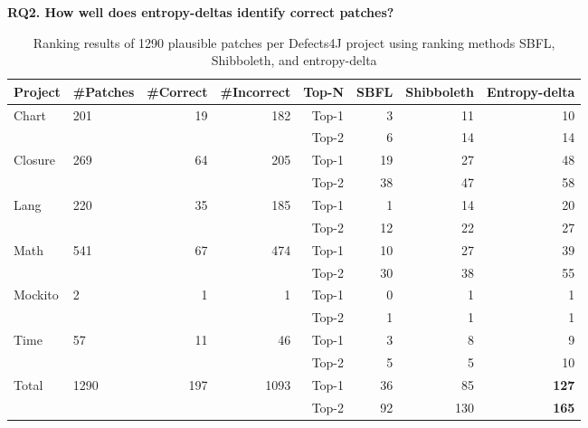 \documentclass[12pt,openany,oneside,table]{cmuthesis}
\begin{document}
\noindent\textbf{RQ2. How well does entropy-deltas identify correct patches?}
\begin{table}[t]
  \centering
\caption{\small Ranking results of 1290 plausible patches per Defects4J project using ranking methods SBFL, Shibboleth, and entropy-delta}
\begin{tabular}{l|lrrrrrr} 
\toprule
 \textbf{Project} & \textbf{\#Patches} & \textbf{\#Correct} &
 \textbf{\#Incorrect} & \textbf{Top-N} & \textbf{SBFL} & \textbf{Shibboleth} &
 \textbf{Entropy-delta}\\
\midrule
\multirow{2}{*}{Chart} & \multirow{2}{*}{201} & \multirow{2}{*}{19} &
\multirow{2}{*}{182} & Top-1              & 3  & 11  & 10   \\
&  &  & & Top-2              & 6  & 14  & 14   \\

\midrule
\multirow{2}{*}{Closure} & \multirow{2}{*}{269} & \multirow{2}{*}{64} &
\multirow{2}{*}{205} & Top-1              & 19  & 27  & 48   \\
&  &  & & Top-2              & 38  & 47  & 58   \\

\midrule
\multirow{2}{*}{Lang} & \multirow{2}{*}{220} & \multirow{2}{*}{35} &
\multirow{2}{*}{185} & Top-1              & 1  & 14  & 20   \\
&  &  & & Top-2              & 12  & 22  & 27   \\

\midrule
\multirow{2}{*}{Math} & \multirow{2}{*}{541} & \multirow{2}{*}{67} &
\multirow{2}{*}{474} & Top-1              & 10  & 27  & 39   \\
&  &  & & Top-2              & 30  & 38  & 55   \\

\midrule
\multirow{2}{*}{Mockito} & \multirow{2}{*}{2} & \multirow{2}{*}{1} &
\multirow{2}{*}{1} & Top-1              & 0  & 1  & 1   \\
&  &  & & Top-2              & 1  & 1  & 1   \\

\midrule
\multirow{2}{*}{Time} & \multirow{2}{*}{57} & \multirow{2}{*}{11} &
\multirow{2}{*}{46} & Top-1              & 3  & 8  & 9   \\
&  &  & & Top-2              & 5  & 5  & 10   \\
\midrule
\multirow{2}{*}{Total} & \multirow{2}{*}{1290} & \multirow{2}{*}{197} &
\multirow{2}{*}{1093} & Top-1              & 36  & 85  & \textbf{127}   \\
&  &  & & Top-2              & 92  & 130  & \textbf{165}   \\
\end{tabular}
\label{table:patch_topn}
\end{table}
\end{document}
